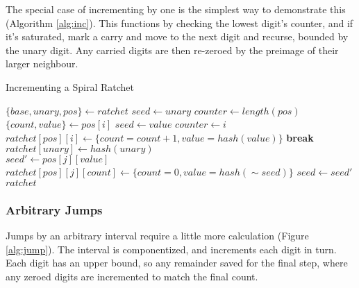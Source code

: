 \documentclass{article}
\begin{document}
	\FloatBarrier
	
	The special case of incrementing by one is the simplest way to demonstrate this (Algorithm \ref{alg:inc}). This functions by checking the lowest digit's counter, and if it's saturated, mark a carry and move to the next digit and recurse, bounded by the unary digit. Any carried digits are then re-zeroed by the preimage of their larger neighbour.
	
	\begin{algorithm}
		\caption{Incrementing a Spiral Ratchet}
		\label{alg:inc}

		\begin{algorithmic}[1]
				\State $\{base, unary, pos\} \gets ratchet$
				\State $seed \gets unary$
				\State $counter \gets length(pos)$
				\\
					\State $\{count, value\} \gets pos[i]$
					 
						\State $seed \gets value$
						\State $counter \gets i$
						\State $ratchet[pos][i] \gets \{ count = count + 1, value = hash(value)\}$
						\State \textbf{break}
					\EndIf
				\EndFor
				\\
				 
					\State $ratchet[unary] \gets hash(unary)$
				\EndIf
				\\
					 
						\State $seed' \gets pos[j][value]$
						\State $ratchet[pos][j][count] \gets \{count = 0, value = hash(\sim{seed})\}$
						\State $seed \gets seed'$
					\EndFor
				\EndIf
				\\
				\State $ratchet$
				\EndFunction
		\end{algorithmic}
	\end{algorithm}

	\subsubsection{Arbitrary Jumps}

	Jumps by an arbitrary interval require a little more calculation (Figure \ref{alg:jump}). The interval is componentized, and increments each digit in turn. Each digit has an upper bound, so any remainder saved for the final step, where any zeroed digits are incremented to match the final count.
\end{document}

